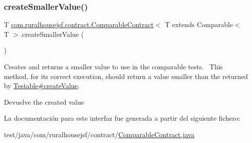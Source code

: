 \subsubsection{\texorpdfstring{createSmallerValue()}{createSmallerValue()}}
{\footnotesize\ttfamily T \mbox{\hyperlink{interfacecom_1_1ruralhousejsf_1_1contract_1_1_comparable_contract}{com.\+ruralhousejsf.\+contract.\+Comparable\+Contract}}$<$ T extends Comparable$<$ T $>$.create\+Smaller\+Value (\begin{DoxyParamCaption}{ }\end{DoxyParamCaption})}

Creates and returns a smaller value to use in the comparable tests.~\newline
 This method, for its correct execution, should return a value smaller than the returned by \mbox{\hyperlink{interfacecom_1_1ruralhousejsf_1_1contract_1_1_testable_ae4546a381488faaba1ef7c0f8688de9c}{Testable\#create\+Value}}.

\begin{DoxyReturn}{Devuelve}
the created value 
\end{DoxyReturn}


La documentación para este interfaz fue generada a partir del siguiente fichero\+:\begin{DoxyCompactItemize}
\item 
test/java/com/ruralhousejsf/contract/\mbox{\hyperlink{_comparable_contract_8java}{Comparable\+Contract.\+java}}\end{DoxyCompactItemize}

